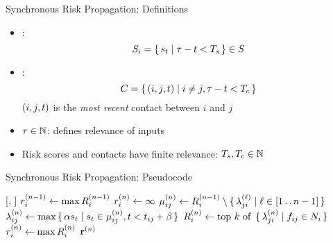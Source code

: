 \documentclass[11pt]{beamer}
\begin{document}
\begin{frame}{Synchronous Risk Propagation: Definitions}
\begin{itemize}
  \item {}:
    \begin{equation*}
      S_i =\set{ s_t | \tau- t< T_s} \in S
    \end{equation*}
    \pause
    \item {}:
      \begin{equation*}
        C = \set{ (i, j, t) | i \neq j, \tau- t< T_c}
      \end{equation*}
      $(i, j, t)$ is the \emph{most recent} contact between $i$ and $j$
      \pause
      \item {} $\tau \in \mathbb{N}$: defines relevance of inputs
      \pause
      \item Risk scores and contacts have finite relevance: $T_s, T_c \in \mathbb{N}$
\end{itemize}
\end{frame}

\begin{frame}{Synchronous Risk Propagation: Pseudocode}
\begin{function}{\nRiskPropagation}[\vScores, \vContacts]
  \pause
  \State $r_{i}^{(n - 1)} \leftarrow \max R_{i}^{(n - 1)}$
  \pause
  \State $r_{i}^{(n)} \leftarrow \infty$
  \pause
  \pause
    \State $\mu_{ij}^{(n)} \leftarrow R_{i}^{(n - 1)} \setminus \set{ \lambda_{ji}^{(\ell)} | \ell \in [1 \mathinner{\ldotp \ldotp} n - 1]}$
    \pause
    \State $\lambda_{ij}^{(n)} \leftarrow \max \set{ \alpha s_t| s_t\in \mu_{ij}^{(n)}, t< t_{ij} + \beta}$
    \pause
    \State $\vRiskScores{i}{n} \assign \topK{\setBuilder{\vFactorMessage{j}{i}{n}}{\vFactor[ij] \in \vNeighbors_i}}$
    \pause
    \State $r_{i}^{(n)} \leftarrow \max R_{i}^{(n)}$
    \pause
  \EndWhile
  \State \Return $\mathbf{r}^{(n)}$
\end{function}
\end{frame}

\end{document}
